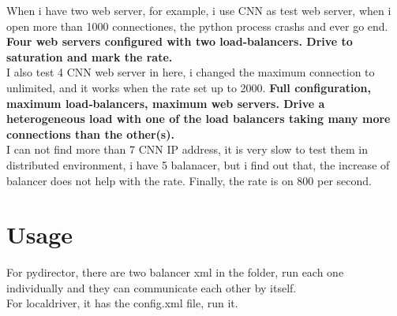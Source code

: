 \documentclass{article}
\begin{document}
When i have two web server, for example, i use CNN as test web server, when i open more than 1000 connectiones, the python process crashs and ever go end.
\textbf{Four web servers configured with two load‐balancers. Drive to saturation and mark the rate.}\\

I also test 4 CNN web server in here, i changed the maximum connection to unlimited, and it works when the rate set up to 2000.
\textbf{Full configuration, maximum load‐balancers, maximum web servers. Drive a heterogeneous load with one of the load balancers taking many more connections than the other(s).}\\

I can not find more than 7 CNN IP address, it is very slow to test them in distributed environment, i have 5 balanacer, but i find out that, the increase of balancer does not help with the rate. Finally, the rate is on 800 per second.\\

\section{Usage}
For pydirector, there are two balancer xml in the folder, run each one individually and they can communicate each other by itself.\\

For localdriver, it has the config.xml file, run it.\\
\end{document}
